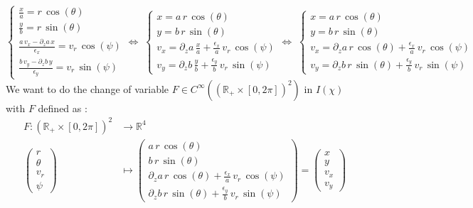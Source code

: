 \documentclass[10pt]{article}
\newcommand{\D}{{\partial}}
\begin{document}
$$\left\lbrace
    \begin{array}{ll}
\frac{x}{a} = r\,\cos(\theta) \\
\frac{y}{b} = r\,\sin(\theta) \\
\frac{a\,v_x - \D_{z} a\,x}{\epsilon_{x}} = v_r\,\cos(\psi) \\
\frac{b\,v_y - \D_{z} b\,y}{\epsilon_{y}} = v_r\,\sin(\psi)
    \end{array}
\right. \iff \; 
\left\lbrace
    \begin{array}{ll}
x = a\,r\,\cos(\theta) \\
y = b\,r\,\sin(\theta) \\
v_x = \D_{z} a\,\frac{x}{a} + \frac{\epsilon_{x}}{a}\,v_r\,\cos(\psi) \\
v_y = \D_{z} b\,\frac{y}{b} + \frac{\epsilon_{y}}{b}\,v_r\,\sin(\psi) 
    \end{array}
\right. \iff \; 
\boxed{\left\lbrace
    \begin{array}{ll}
x = a\,r\,\cos(\theta) \\
y = b\,r\,\sin(\theta) \\
v_x = \D_{z} a\,r\,\cos(\theta) + \frac{\epsilon_{x}}{a}\,v_r\,\cos(\psi) \\
v_y = \D_{z} b\,r\,\sin(\theta) + \frac{\epsilon_{y}}{b}\,v_r\,\sin(\psi)
    \end{array}
\right.}
$$
We want to do the change of variable $F\in C^{\infty}\left(\left( \mathbb{R}_{+}\times\left[0,2\pi\right]\right)^2\right)$ in $I(\chi)$ with $F$ defined as : 
\begin{align*}
  F : \left( \mathbb{R}_{+}\times\left[0,2\pi\right]\right)^2 &\to   \mathbb{R}^4 \\
  \left( \begin{array}{cc}
            r \\ \theta \\ v_r \\ \psi
         \end{array} \right) &\mapsto
  \left( \begin{array}{cc}
            a\,r\,\cos(\theta) \\
            b\,r\,\sin(\theta) \\
            \D_{z} a\,r\,\cos(\theta) + \frac{\epsilon_{x}}{a}\,v_r\,\cos(\psi) \\
            \D_{z} b\,r\,\sin(\theta) + \frac{\epsilon_{y}}{b}\,v_r\,\sin(\psi)
          \end{array} \right) = \left(\begin{array}{cc}
          x \\ y \\ v_x \\ v_y
          \end{array}\right)
\end{align*}
\end{document}
